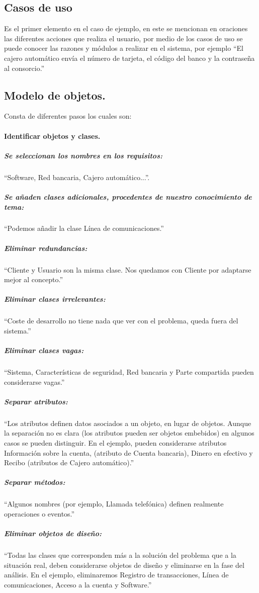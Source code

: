 \documentclass[spanish,12pt,letterpapper]{article}
\begin{document}
	\subsection{Casos de uso} 
	Es el primer elemento en el caso de ejemplo, en este se mencionan en oraciones las diferentes acciones que realiza el usuario, por medio de los casos de uso se puede conocer las razones y módulos a realizar en el sistema, por ejemplo ``El cajero automático envía el número de tarjeta, el código del banco y la contraseña al consorcio.''\\
	
	\subsection{Modelo de objetos.} Consta de diferentes pasos los cuales son:
	\paragraph{Identificar objetos y clases.} 
	\subparagraph{Se seleccionan los nombres en los requisitos:} ``Software, Red bancaria, Cajero automático...''.
	\subparagraph{Se añaden clases adicionales, procedentes de nuestro conocimiento de tema:} ``Podemos añadir la clase Línea de comunicaciones.''
	\subparagraph{Eliminar  redundancias:} ``Cliente y Usuario son la misma clase. Nos quedamos con Cliente por adaptarse mejor al concepto.''
	\subparagraph{Eliminar clases irrelevantes:} ``Coste de desarrollo no tiene nada que ver con el problema, queda fuera del sistema.''
	\subparagraph{Eliminar clases vagas:}``Sistema, Características de seguridad, Red bancaria y Parte compartida pueden considerarse vagas.''
	\subparagraph{Separar atributos:}``Los atributos definen datos asociados a un objeto, en lugar de objetos. Aunque la separación no es clara (los atributos pueden ser objetos embebidos) en algunos casos se pueden distinguir. En el ejemplo, pueden considerarse atributos Información sobre la cuenta, (atributo de Cuenta bancaria), Dinero en efectivo y Recibo (atributos de Cajero automático).''
	\subparagraph{Separar métodos:}``Algunos nombres (por ejemplo, Llamada telefónica) definen realmente operaciones o eventos.''
	\subparagraph{Eliminar objetos de diseño:}``Todas las clases que corresponden más a la solución del problema que a la situación real, deben considerarse objetos de diseño y eliminarse en la fase del análisis. En el ejemplo, eliminaremos Registro de transacciones, Línea de comunicaciones, Acceso a la cuenta y Software.''
	
\end{document}

